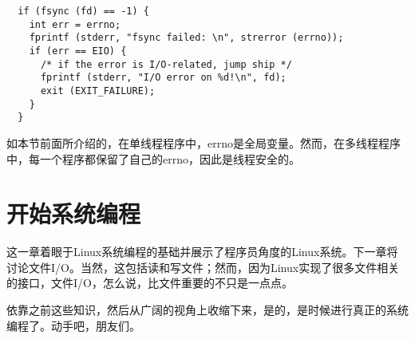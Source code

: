 \begin{lstlisting}
  if (fsync (fd) == -1) {
    int err = errno;
    fprintf (stderr, "fsync failed: \n", strerror (errno));
    if (err == EIO) {
      /* if the error is I/O-related, jump ship */
      fprintf (stderr, "I/O error on %d!\n", fd);
      exit (EXIT_FAILURE);
    }
  }
\end{lstlisting}

如本节前面所介绍的，在单线程程序中，errno是全局变量。然而，在多线程程序中，每一个程序都保留了自己的errno，因此是线程安全的。 

\section{开始系统编程}
这一章着眼于Linux系统编程的基础并展示了程序员角度的Linux系统。下一章将讨论文件I/O。当然，这包括读和写文件；然而，因为Linux实现了很多文件相关的接口，文件I/O，怎么说，比文件重要的不只是一点点。

依靠之前这些知识，然后从广阔的视角上收缩下来，是的，是时候进行真正的系统编程了。动手吧，朋友们。 
